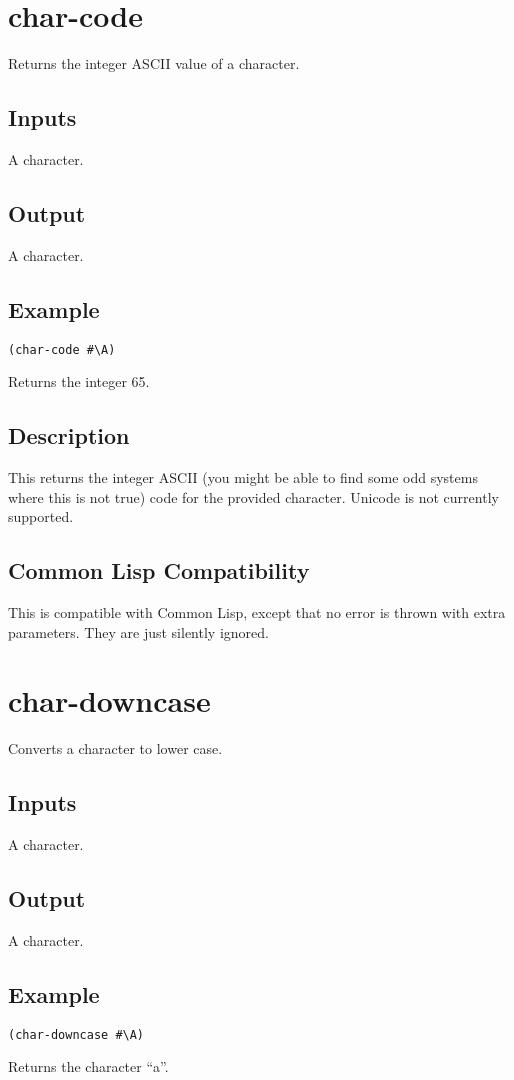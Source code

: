 \documentclass[10pt, openany]{book}
\newcommand{\cl}{Common Lisp}
\begin{document}
\section{char-code}
Returns the integer ASCII value of a character.
\subsection{Inputs}
A character.
\subsection{Output}
A character.
\subsection{Example}
\begin{lstlisting}
(char-code #\A)
\end{lstlisting}
Returns the integer 65.
\subsection{Description}
This returns the integer ASCII (you might be able to find some odd systems where this is not true) code for the provided character.  Unicode is not currently supported.
\subsection{Common Lisp Compatibility}
This is compatible with \cl, except that no error is thrown with extra parameters.  They are just silently ignored.

\section{char-downcase}
Converts a character to lower case.
\subsection{Inputs}
A character.
\subsection{Output}
A character.
\subsection{Example}
\begin{lstlisting}
(char-downcase #\A)
\end{lstlisting}
Returns the character ``a''.
\end{document}
